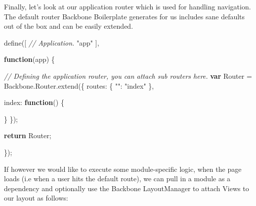\documentclass[9pt]{book}
\newenvironment{Shaded}{}{}
\newcommand{\KeywordTok}[1]{\textcolor[rgb]{0.00,0.44,0.13}{\textbf{{#1}}}}
\newcommand{\DataTypeTok}[1]{\textcolor[rgb]{0.56,0.13,0.00}{{#1}}}
\newcommand{\StringTok}[1]{\textcolor[rgb]{0.25,0.44,0.63}{{#1}}}
\newcommand{\CommentTok}[1]{\textcolor[rgb]{0.38,0.63,0.69}{\textit{{#1}}}}
\newcommand{\OtherTok}[1]{\textcolor[rgb]{0.00,0.44,0.13}{{#1}}}
\newcommand{\FunctionTok}[1]{\textcolor[rgb]{0.02,0.16,0.49}{{#1}}}
\newcommand{\NormalTok}[1]{{#1}}
\begin{document}
Finally, let's look at our application router which is used for handling
navigation. The default router Backbone Boilerplate generates for us
includes sane defaults out of the box and can be easily extended.

\begin{Shaded}
\begin{Highlighting}[]
\FunctionTok{define}\NormalTok{([}
  \CommentTok{// Application.}
  \StringTok{"app"}
\NormalTok{],}

\KeywordTok{function}\NormalTok{(app) \{}

  \CommentTok{// Defining the application router, you can attach sub routers here.}
  \KeywordTok{var} \NormalTok{Router = }\OtherTok{Backbone}\NormalTok{.}\OtherTok{Router}\NormalTok{.}\FunctionTok{extend}\NormalTok{(\{}
    \DataTypeTok{routes}\NormalTok{: \{}
      \StringTok{""}\NormalTok{: }\StringTok{"index"}
    \NormalTok{\},}

    \DataTypeTok{index}\NormalTok{: }\KeywordTok{function}\NormalTok{() \{}

    \NormalTok{\}}
  \NormalTok{\});}

  \KeywordTok{return} \NormalTok{Router;}

\NormalTok{\});}
\end{Highlighting}
\end{Shaded}

If however we would like to execute some module-specific logic, when the
page loads (i.e when a user hits the default route), we can pull in a
module as a dependency and optionally use the Backbone LayoutManager to
attach Views to our layout as follows:
\end{document}
